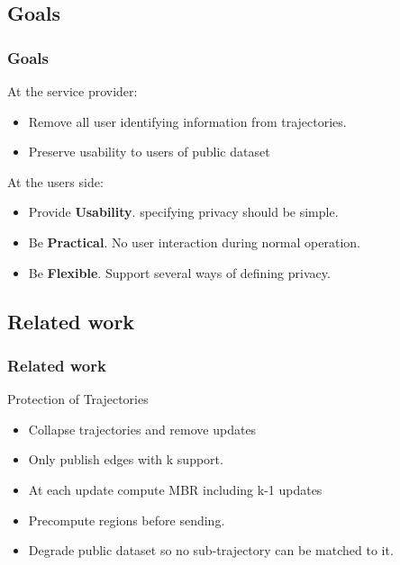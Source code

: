\subsection{Goals} %

\begin{frame}[red] %
\frametitle{Goals}

At the service provider:
\begin{itemize}
\item Remove all user identifying information from trajectories.
\item Preserve usability to users of public dataset
\end{itemize}

\vspace{3em}
At the users side:\\

\begin{itemize}
\item  Provide {\bf Usability}. specifying privacy should be simple.
\item Be {\bf Practical}. No user interaction during normal operation.
\item Be {\bf Flexible}. Support several ways of defining privacy.
\end{itemize}
\end{frame}

\subsection{Related work}

\begin{frame}
\frametitle{Related work}

Protection of Trajectories
\begin{itemize}
\item Collapse trajectories and remove updates
\item Only publish edges with k support.
\vspace{1em}
\item At each update compute MBR including k-1 updates
\item Precompute regions before sending.
\vspace{1em}
\item Degrade public dataset so no sub-trajectory can be matched to it.

\end{itemize}

\end{frame}


